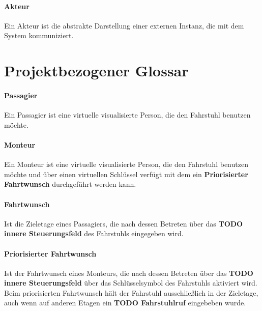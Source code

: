 \paragraph{Akteur}
Ein Akteur ist die abstrakte Darstellung einer externen Instanz, die mit dem System kommuniziert.

\section{Projektbezogener Glossar}
\paragraph{Passagier}
Ein Passagier ist eine virtuelle visualisierte Person, die den Fahrstuhl benutzen möchte.

\paragraph{Monteur}
Ein Monteur ist eine virtuelle visualisierte Person, die den Fahrstuhl benutzen möchte und über einen virtuellen Schlüssel verfügt mit dem ein \textbf{Priorisierter Fahrtwunsch}
durchgeführt werden kann.

\paragraph{Fahrtwunsch}
Ist die Zieletage eines Passagiers, die nach dessen Betreten über das \textbf{TODO innere Steuerungsfeld} des Fahrstuhls eingegeben wird.


\paragraph{Priorisierter Fahrtwunsch}
Ist der Fahrtwunsch eines Monteurs, die nach dessen Betreten über das \textbf{TODO innere Steuerungsfeld} über das Schlüsselsymbol des Fahrstuhls aktiviert wird. Beim priorisierten Fahrtwunsch hält der Fahrstuhl ausschließlich in der Zieletage, auch wenn auf anderen Etagen ein \textbf{TODO Fahrstuhlruf} eingebeben wurde.

